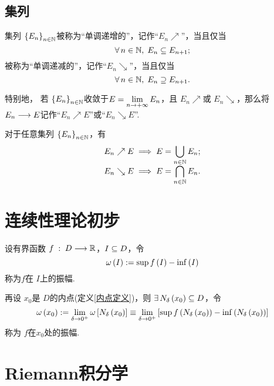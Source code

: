 \subsection{集列}
\begin{proposition}[集列极限的运算法则]\label{集列极限的运算法则}
    
\end{proposition}
\begin{definition}[单调集列]\label{单调集列定义}
    集列 $\z\{E_n\y\}_{n\in\N}$被称为“单调递增的”，记作“$E_n\nearrow$”，当且仅当
    \[ \forall\,n\in\N,\;E_n\sb E_{n+1}; \]
    被称为“单调递减的”，记作“$E_n\searrow$”，当且仅当
    \[ \forall\,n\in\N,\;E_n\sp E_{n+1}. \]

    特别地， 若 $\z\{E_n\y\}_{n\in\N}$收敛于$\displaystyle E= \lim_{n\to+\wq} E_n$，且 $E_n\nearrow$或 $E_n\searrow$，那么将 $E_n\ra E$记作“$E_n\nearrow E$”或“$E_n\searrow E$”.
\end{definition}
\begin{corollary}\label{单调收敛集列推论}
    对于任意集列 $\z\{E_n\y\}_{n\in\N}$，有
    \[\begin{array}{c}
       \displaystyle E_n\nearrow E \implies E=\bcup_{n\in\N} E_n;  \\
       \displaystyle E_n\searrow E \implies E=\bcap_{n\in\N} E_n.
    \end{array}\]
\end{corollary}

\section{连续性理论初步}
\begin{definition}[振幅]\label{函数振幅定义}
    设有界函数 $f\;:\;D\ra\R$，$I\sb D$，令 \[   \omega\z(I\y)\defi\sup f\z(I\y) - \inf\z(I\y)   \] 称为$f$在 $I$上的振幅.

    再设 $x_0$是 $D$的内点(定义\ref{内点定义})，则 $\exists\,N_\delta\z(x_0\y)\sb D$，令 \[  \omega\z(x_0\y) \defi \lim_{\delta\to 0^+} \omega\z[N_\delta\z(x_0\y)\y] \equiv\lim_{\delta\to 0^+} \z[  \sup f\z(N_\delta\z(x_0\y)\y) - \inf\z(N_\delta\z(x_0\y)\y)  \y]   \] 称为 $f$在$x_0$处的振幅.
\end{definition}





\section{Riemann积分学}

